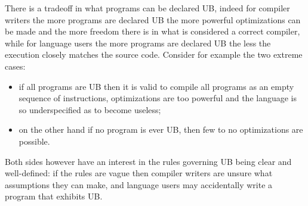 \documentclass[a4paper,11pt]{article}
\theoremstyle{plain}
\theoremstyle{definition}
\theoremstyle{remark}
\begin{document}
There is a tradeoff in what programs can be declared UB, indeed for compiler writers
the more programs are declared UB the more powerful optimizations can be made and
the more freedom there is in what is considered a correct compiler, while for language
users the more programs are declared UB the less the execution closely matches the source
code. Consider for example the two extreme cases:
\begin{itemize}
    \item if all programs are UB then it is valid to compile all programs as an
        empty sequence of instructions, optimizations are too powerful and the language
        is so underspecified as to become useless;
    \item on the other hand if no program is ever UB, then few to no optimizations are possible.
\end{itemize}
Both sides however have an interest in the rules governing UB being clear and well-defined:
if the rules are vague then compiler writers are unsure what assumptions they can make,
and language users may accidentally write a program that exhibits UB.
\end{document}
